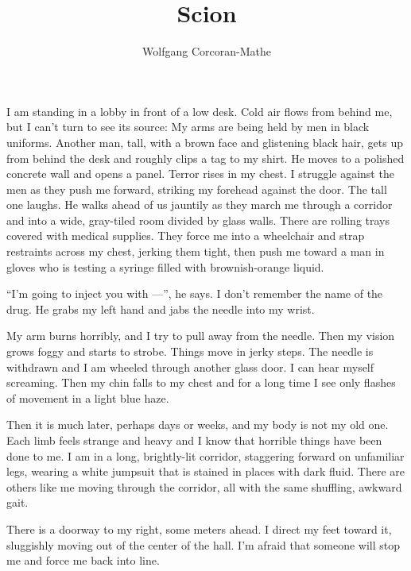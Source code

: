 \documentclass[10pt,b5paper]{article}
\begin{document}
\title{Scion}
\author{Wolfgang Corcoran-Mathe}
\date{}
\maketitle

\section{}

I am standing in a lobby in front of a low desk. Cold air flows from
behind me, but I can't turn to see its source: My arms are being held
by men in black uniforms.  Another man, tall, with a brown face and
glistening black hair, gets up from behind the desk and roughly clips
a tag to my shirt.  He moves to a polished concrete wall and opens
a panel.  Terror rises in my chest. I struggle against the men as
they push me forward, striking my forehead against the door. The tall
one laughs. He walks ahead of us jauntily as they march me through a
corridor and into a wide, gray-tiled room divided by glass walls. There
are rolling trays covered with medical supplies. They force me into a
wheelchair and strap restraints across my chest, jerking them tight,
then push me toward a man in gloves who is testing a syringe filled
with brownish-orange liquid.

``I'm going to inject you with ---'', he says. I don't remember the
name of the drug. He grabs my left hand and jabs the needle into
my wrist.

My arm burns horribly, and I try to pull away from the needle. Then my
vision grows foggy and starts to strobe. Things move in jerky steps.
The needle is withdrawn and I am wheeled through another glass door. I
can hear myself screaming. Then my chin falls to my chest and for a
long time I see only flashes of movement in a light blue haze.

Then it is much later, perhaps days or weeks, and my body is not my
old one. Each limb feels strange and heavy and I know that horrible
things have been done to me.  I am in a long, brightly-lit corridor,
staggering forward on unfamiliar legs, wearing a white jumpsuit that
is stained in places with dark fluid. There are others like me moving
through the corridor, all with the same shuffling, awkward gait.

There is a doorway to my right, some meters ahead. I direct my
feet toward it, sluggishly moving out of the center of the hall.
I'm afraid that someone will stop me and force me back into line.
\end{document}
